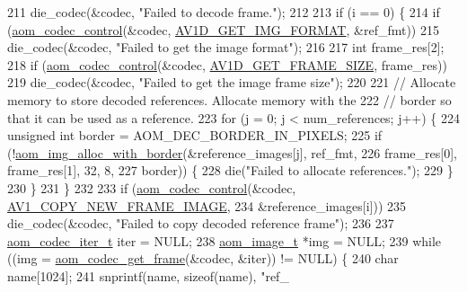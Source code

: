 \begin{DoxyCodeInclude}
{{{{211       die\_codec(&codec, \textcolor{stringliteral}{"Failed to decode frame."});
212 
213     \textcolor{keywordflow}{if} (i == 0) \{
214       \textcolor{keywordflow}{if} (\hyperlink{group__codec_ga6da974f4eeaba1fa74106b28d0fe6ac5}{aom\_codec\_control}(&codec, \hyperlink{group__aom__decoder_gga3865fd4b3192489baa9a5c3632ebe97bacd7229e5fb766670fe995739931c2ee3}{AV1D\_GET\_IMG\_FORMAT}, &ref\_fmt))
215         die\_codec(&codec, \textcolor{stringliteral}{"Failed to get the image format"});
216 
217       \textcolor{keywordtype}{int} frame\_res[2];
218       \textcolor{keywordflow}{if} (\hyperlink{group__codec_ga6da974f4eeaba1fa74106b28d0fe6ac5}{aom\_codec\_control}(&codec, \hyperlink{group__aom__decoder_gga3865fd4b3192489baa9a5c3632ebe97ba175c454a7adf2d3927a0e979b4a2b07b}{AV1D\_GET\_FRAME\_SIZE}, frame\_res))
219         die\_codec(&codec, \textcolor{stringliteral}{"Failed to get the image frame size"});
220 
221       \textcolor{comment}{// Allocate memory to store decoded references. Allocate memory with the}
222       \textcolor{comment}{// border so that it can be used as a reference.}
223       \textcolor{keywordflow}{for} (j = 0; j < num\_references; j++) \{
224         \textcolor{keywordtype}{unsigned} \textcolor{keywordtype}{int} border = AOM\_DEC\_BORDER\_IN\_PIXELS;
225         \textcolor{keywordflow}{if} (!\hyperlink{aom__image_8h_aeb211e5184687f7e10d7c5bed4dcfdcd}{aom\_img\_alloc\_with\_border}(&reference\_images[j], ref\_fmt,
226                                        frame\_res[0], frame\_res[1], 32, 8,
227                                        border)) \{
228           die(\textcolor{stringliteral}{"Failed to allocate references."});
229         \}
230       \}
231     \}
232 
233     \textcolor{keywordflow}{if} (\hyperlink{group__codec_ga6da974f4eeaba1fa74106b28d0fe6ac5}{aom\_codec\_control}(&codec, \hyperlink{group__aom_gga9421a1fa78c0d9587ae5aa6c1cb3d659ae41763622ee33cd99e23ca8f78a3f8fa}{AV1\_COPY\_NEW\_FRAME\_IMAGE},
234                           &reference\_images[i]))
235       die\_codec(&codec, \textcolor{stringliteral}{"Failed to copy decoded reference frame"});
236 
237     \hyperlink{group__codec_gadf9e173c9e02788a9999399edab20a02}{aom\_codec\_iter\_t} iter = NULL;
238     \hyperlink{structaom__image}{aom\_image\_t} *img = NULL;
239     \textcolor{keywordflow}{while} ((img = \hyperlink{group__decoder_ga780aad27a2728abefab725faa3bc4f79}{aom\_codec\_get\_frame}(&codec, &iter)) != NULL) \{
240       \textcolor{keywordtype}{char} name[1024];
241       snprintf(name, \textcolor{keyword}{sizeof}(name), \textcolor{stringliteral}{"ref\_%
}}}}}
\end{DoxyCodeInclude}
